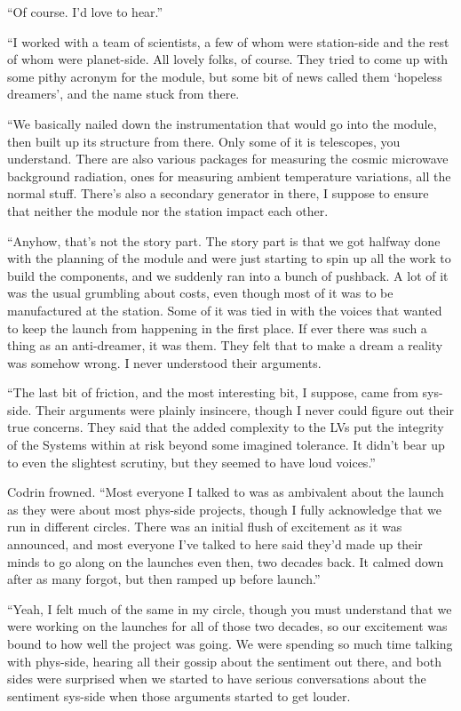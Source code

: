 ``Of course. I'd love to hear.''

``I worked with a team of scientists, a few of whom were station-side and the rest of whom were planet-side. All lovely folks, of course. They tried to come up with some pithy acronym for the module, but some bit of news called them `hopeless dreamers', and the name stuck from there.

``We basically nailed down the instrumentation that would go into the module, then built up its structure from there. Only some of it is telescopes, you understand. There are also various packages for measuring the cosmic microwave background radiation, ones for measuring ambient temperature variations, all the normal stuff. There's also a secondary generator in there, I suppose to ensure that neither the module nor the station impact each other.

``Anyhow, that's not the story part. The story part is that we got halfway done with the planning of the module and were just starting to spin up all the work to build the components, and we suddenly ran into a bunch of pushback. A lot of it was the usual grumbling about costs, even though most of it was to be manufactured at the station. Some of it was tied in with the voices that wanted to keep the launch from happening in the first place. If ever there was such a thing as an anti-dreamer, it was them. They felt that to make a dream a reality was somehow wrong. I never understood their arguments.

``The last bit of friction, and the most interesting bit, I suppose, came from sys-side. Their arguments were plainly insincere, though I never could figure out their true concerns. They said that the added complexity to the LVs put the integrity of the Systems within at risk beyond some imagined tolerance. It didn't bear up to even the slightest scrutiny, but they seemed to have loud voices.''

Codrin frowned. ``Most everyone I talked to was as ambivalent about the launch as they were about most phys-side projects, though I fully acknowledge that we run in different circles. There was an initial flush of excitement as it was announced, and most everyone I've talked to here said they'd made up their minds to go along on the launches even then, two decades back. It calmed down after as many forgot, but then ramped up before launch.''

``Yeah, I felt much of the same in my circle, though you must understand that we were working on the launches for all of those two decades, so our excitement was bound to how well the project was going. We were spending so much time talking with phys-side, hearing all their gossip about the sentiment out there, and both sides were surprised when we started to have serious conversations about the sentiment sys-side when those arguments started to get louder.

